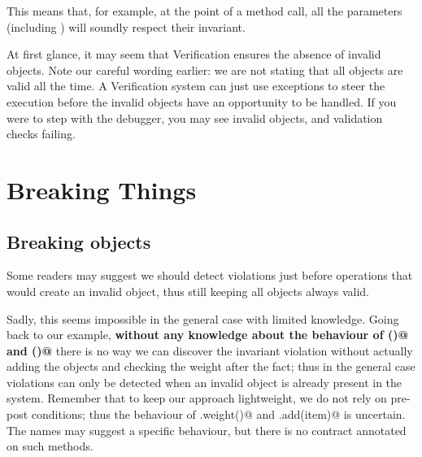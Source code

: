 
\noindent This means that, for example, at the point of a method call,
all the parameters (including \Q@this@) will soundly respect their invariant.

\noindent At first glance, it may seem that Verification ensures the absence of invalid objects.
Note our careful wording earlier: we are not stating that all objects are valid all the time.
A Verification system can just use exceptions to
steer the execution before the invalid objects have an opportunity to be handled.
If you were to step with the debugger, you may see invalid objects, and
validation checks failing.


 


 

\section{Breaking Things}
\label{s:example}
\saveSpace

\subsection{Breaking objects}
\saveSpace

Some readers may suggest we should detect violations just before operations that would create an invalid object,
thus still keeping all objects always valid.

Sadly, this seems impossible in the general case with limited knowledge.
Going back to our \Q@Boat@ example,
\textbf{without any knowledge about the behaviour of \Q@add()@ and \Q@weight()@}%
there is no way we can discover the invariant violation without actually adding the objects and checking the 
weight after the fact; thus in the general case violations can only be detected 
when an invalid object is already present in the system.
Remember that to keep our approach lightweight,
we do not rely on pre-post conditions; thus
the behaviour of \Q@Items.weight()@ and \Q@Items.add(item)@ is uncertain.
The names may suggest a specific behaviour, but there is no contract annotated on such methods.

